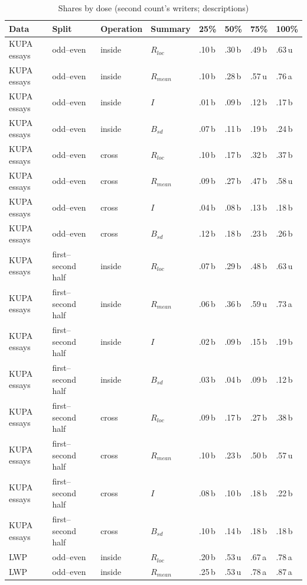 \begin{table}[htbp]
\caption{Shares by dose (second count's writers; descriptions)}
\label{tab:dose}
\scriptsize
\begin{tabularx}{\linewidth}{@{}llllXXXX@{}}
\toprule
Data & Split & Operation & Summary & 25\% & 50\% & 75\% & 100\% \\
\midrule
KUPA essays & odd--even & inside & $R_{loc}$ & .10\,b & .30\,b & .49\,b & .63\,u \\
KUPA essays & odd--even & inside & $R_{mean}$ & .10\,b & .28\,b & .57\,u & .76\,a \\
KUPA essays & odd--even & inside & $I$ & .01\,b & .09\,b & .12\,b & .17\,b \\
KUPA essays & odd--even & inside & $B_{sd}$ & .07\,b & .11\,b & .19\,b & .24\,b \\
KUPA essays & odd--even & cross & $R_{loc}$ & .10\,b & .17\,b & .32\,b & .37\,b \\
KUPA essays & odd--even & cross & $R_{mean}$ & .09\,b & .27\,b & .47\,b & .58\,u \\
KUPA essays & odd--even & cross & $I$ & .04\,b & .08\,b & .13\,b & .18\,b \\
KUPA essays & odd--even & cross & $B_{sd}$ & .12\,b & .18\,b & .23\,b & .26\,b \\
KUPA essays & first--second half & inside & $R_{loc}$ & .07\,b & .29\,b & .48\,b & .63\,u \\
KUPA essays & first--second half & inside & $R_{mean}$ & .06\,b & .36\,b & .59\,u & .73\,a \\
KUPA essays & first--second half & inside & $I$ & .02\,b & .09\,b & .15\,b & .19\,b \\
KUPA essays & first--second half & inside & $B_{sd}$ & .03\,b & .04\,b & .09\,b & .12\,b \\
KUPA essays & first--second half & cross & $R_{loc}$ & .09\,b & .17\,b & .27\,b & .38\,b \\
KUPA essays & first--second half & cross & $R_{mean}$ & .10\,b & .23\,b & .50\,b & .57\,u \\
KUPA essays & first--second half & cross & $I$ & .08\,b & .10\,b & .18\,b & .22\,b \\
KUPA essays & first--second half & cross & $B_{sd}$ & .10\,b & .14\,b & .18\,b & .18\,b \\
LWP & odd--even & inside & $R_{loc}$ & .20\,b & .53\,u & .67\,a & .78\,a \\
LWP & odd--even & inside & $R_{mean}$ & .25\,b & .53\,u & .78\,a & .87\,a \\

\end{tabularx}
\end{table}
